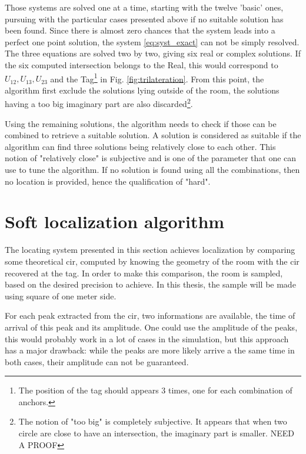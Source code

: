 Those systems are solved one at a time, starting with the twelve 'basic' ones, pursuing with the particular cases presented above if no suitable solution has been found. Since there is almost zero chances that the system leads into a perfect one point solution, the system \ref{eq:syst_exact} can not be simply resolved. The three equations are solved two by two, giving six real or complex solutions. If the six computed intersection belongs to the Real, this would correspond to $U_{12}, U_{13}, U_{23}$ and the Tag\footnote{The position of the tag should appears 3 times, one for each combination of anchors.} in Fig. \ref{fig:trilateration}. From this point, the algorithm first exclude the solutions lying outside of the room, the solutions having a too big imaginary part are also discarded\footnote{The notion of "too big" is completely subjective. It appears that when two circle are close to have an intersection, the imaginary part is smaller. \color{red} NEED A PROOF \color{black}}. 
\vspace{2mm}

Using the remaining solutions, the algorithm needs to check if those can be combined to retrieve a suitable solution. A solution is considered as suitable if the algorithm can find three solutions being relatively close to each other. This notion of "relatively close" is subjective and is one of the parameter that one can use to tune the algorithm. If no solution is found using all the combinations, then no location is provided, hence the qualification of "hard".
\vspace{2mm}

\section{Soft localization algorithm}
\label{soft_loc}

The locating system presented in this section achieves localization by comparing some theoretical \gls{cir}, computed by knowing the geometry of the room with the \gls{cir} recovered at the tag. In order to make this comparison, the room is sampled, based on the desired precision to achieve. In this thesis, the sample will be made using square of one meter side.
\vspace{2mm}

For each peak extracted from the \gls{cir}, two informations are available, the time of arrival of this peak and its amplitude. One could use the amplitude of the peaks, this would probably work in a lot of cases in the simulation, but this approach has a major drawback: while the peaks are more likely arrive a the same time in both cases, their amplitude can not be guaranteed.
\vspace{2mm}

